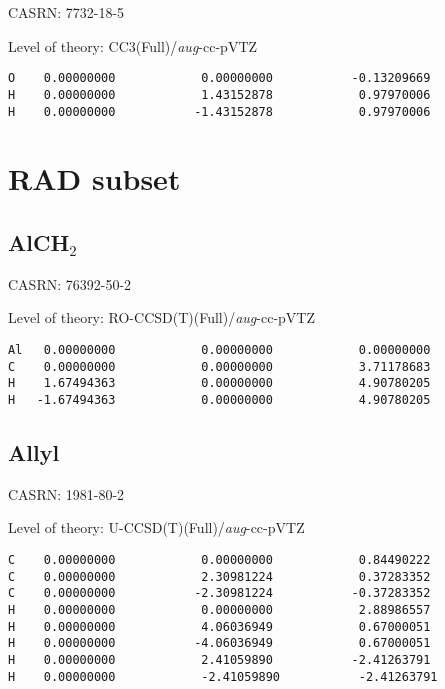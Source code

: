 \documentclass[journal=jctcce,manuscript=article,layout=traditional]{achemso}
\newcommand{\AVTZ}{\emph{aug}-cc-pVTZ}
\begin{document}
CASRN: 7732-18-5

\begin{singlespace}
\noindent Level of theory: CC3(Full)/{\AVTZ}
\begin{verbatim}
O    0.00000000            0.00000000           -0.13209669
H    0.00000000            1.43152878            0.97970006
H    0.00000000           -1.43152878            0.97970006
\end{verbatim}
\end{singlespace}

\clearpage


\section{RAD subset}

\subsection{AlCH$_2$}

CASRN: 76392-50-2

\begin{singlespace}
\noindent Level of theory: RO-CCSD(T)(Full)/{\AVTZ}
\begin{verbatim}
Al   0.00000000            0.00000000            0.00000000  
C    0.00000000            0.00000000            3.71178683  
H    1.67494363            0.00000000            4.90780205  
H   -1.67494363            0.00000000            4.90780205  
\end{verbatim}
\end{singlespace}


\subsection{Allyl}

CASRN: 1981-80-2

\begin{singlespace}
\noindent Level of theory: U-CCSD(T)(Full)/{\AVTZ}
\begin{verbatim}
C    0.00000000            0.00000000            0.84490222  
C    0.00000000            2.30981224            0.37283352  
C    0.00000000           -2.30981224           -0.37283352  
H    0.00000000            0.00000000            2.88986557  
H    0.00000000            4.06036949            0.67000051  
H    0.00000000           -4.06036949            0.67000051  
H    0.00000000            2.41059890           -2.41263791  
H    0.00000000            -2.41059890           -2.41263791  
\end{verbatim}
\end{singlespace}
\end{document}
